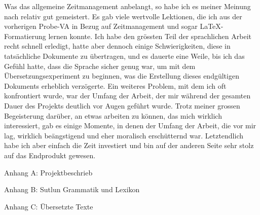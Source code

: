 \documentclass{article}
\begin{document}
Was das allgemeine Zeitmanagement anbelangt, so habe ich es meiner Meinung nach relativ gut gemeistert.
Es gab viele wertvolle Lektionen, die ich aus der vorherigen Probe-VA in Bezug auf Zeitmanagement
und sogar \LaTeX-Formatierung lernen konnte. Ich habe den grössten Teil der sprachlichen Arbeit recht
schnell erledigt, hatte aber dennoch einige Schwierigkeiten, diese in tatsächliche Dokumente zu übertragen,
und es dauerte eine Weile, bis ich das Gefühl hatte, dass die Sprache sicher genug war,
um mit dem Übersetzungsexperiment zu beginnen, was die Erstellung dieses endgültigen Dokuments erheblich verzögerte.
Ein weiteres Problem, mit dem ich oft konfrontiert wurde, war der Umfang der Arbeit,
der mir während der gesamten Dauer des Projekts deutlich vor Augen geführt wurde.
Trotz meiner grossen Begeisterung darüber, an etwas arbeiten zu können, das mich wirklich interessiert,
gab es einige Momente, in denen der Umfang der Arbeit, die vor mir lag, wirklich beängstigend und eher
moralisch erschütternd war. Letztendlich habe ich aber einfach die Zeit investiert und bin auf der anderen
Seite sehr stolz auf das Endprodukt gewesen.







\renewcommand{\section}[1]{
    \begin{center}
    \vspace*{\fill}
    \Huge{#1}
    \vspace*{\fill}
    \end{center}
}

\section{Anhang A: Projektbeschrieb}


\section{Anhang B: Sutlun Grammatik und Lexikon}


\section{Anhang C: Übersetzte Texte}

\end{document}
